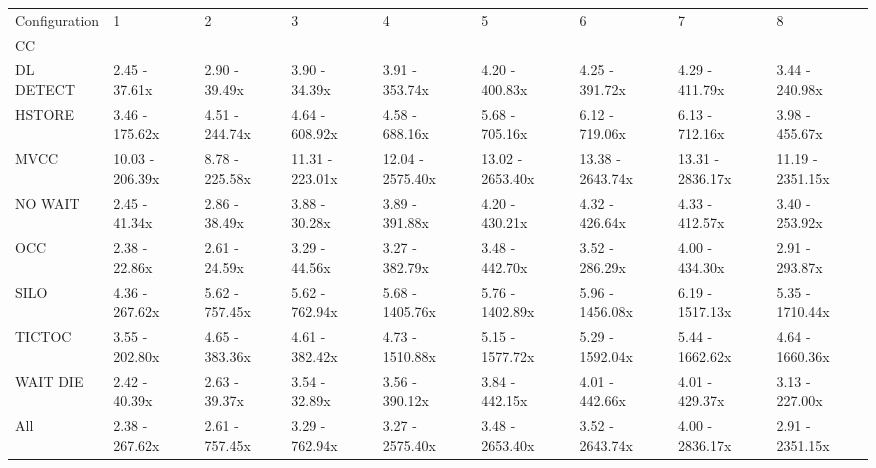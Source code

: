 \begin{tabular}{lllllllll}
\toprule
Configuration &                1 &               2 &                3 &                 4 &                 5 &                 6 &                 7 &                 8 \\
CC        &                  &                 &                  &                   &                   &                   &                   &                   \\
\midrule
DL DETECT &    2.45 - 37.61x &   2.90 - 39.49x &    3.90 - 34.39x &    3.91 - 353.74x &    4.20 - 400.83x &    4.25 - 391.72x &    4.29 - 411.79x &    3.44 - 240.98x \\
HSTORE    &   3.46 - 175.62x &  4.51 - 244.74x &   4.64 - 608.92x &    4.58 - 688.16x &    5.68 - 705.16x &    6.12 - 719.06x &    6.13 - 712.16x &    3.98 - 455.67x \\
MVCC      &  10.03 - 206.39x &  8.78 - 225.58x &  11.31 - 223.01x &  12.04 - 2575.40x &  13.02 - 2653.40x &  13.38 - 2643.74x &  13.31 - 2836.17x &  11.19 - 2351.15x \\
NO WAIT   &    2.45 - 41.34x &   2.86 - 38.49x &    3.88 - 30.28x &    3.89 - 391.88x &    4.20 - 430.21x &    4.32 - 426.64x &    4.33 - 412.57x &    3.40 - 253.92x \\
OCC       &    2.38 - 22.86x &   2.61 - 24.59x &    3.29 - 44.56x &    3.27 - 382.79x &    3.48 - 442.70x &    3.52 - 286.29x &    4.00 - 434.30x &    2.91 - 293.87x \\
SILO      &   4.36 - 267.62x &  5.62 - 757.45x &   5.62 - 762.94x &   5.68 - 1405.76x &   5.76 - 1402.89x &   5.96 - 1456.08x &   6.19 - 1517.13x &   5.35 - 1710.44x \\
TICTOC    &   3.55 - 202.80x &  4.65 - 383.36x &   4.61 - 382.42x &   4.73 - 1510.88x &   5.15 - 1577.72x &   5.29 - 1592.04x &   5.44 - 1662.62x &   4.64 - 1660.36x \\
WAIT DIE  &    2.42 - 40.39x &   2.63 - 39.37x &    3.54 - 32.89x &    3.56 - 390.12x &    3.84 - 442.15x &    4.01 - 442.66x &    4.01 - 429.37x &    3.13 - 227.00x \\
All       &   2.38 - 267.62x &  2.61 - 757.45x &   3.29 - 762.94x &   3.27 - 2575.40x &   3.48 - 2653.40x &   3.52 - 2643.74x &   4.00 - 2836.17x &   2.91 - 2351.15x \\
\bottomrule
\end{tabular}
